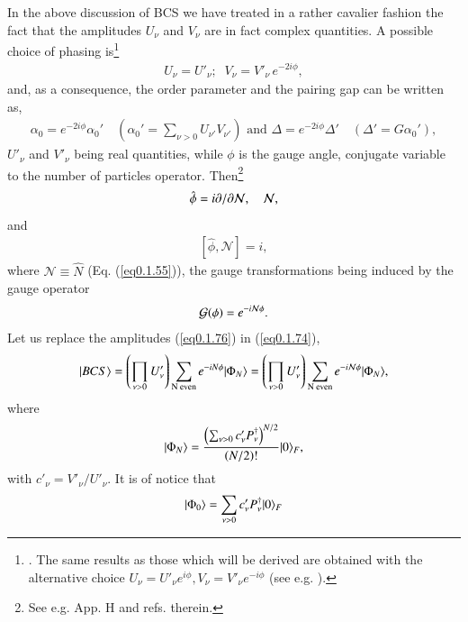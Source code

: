  In the above discussion of BCS we have treated in a rather cavalier fashion the fact that the amplitudes $U_\nu$ and $V_\nu$ are in fact complex quantities. 
  A possible choice of phasing is\footnote{\cite{Schrieffer:73}. The same results as those which will be derived are obtained with the alternative choice $U_\nu=U'_\nu e^{i\phi},V_\nu=V'_\nu e^{-i\phi}$ (see e.g. \cite{Potel:13b}).} 
\begin{align}\label{eq0.1.76}
U_\nu=U'_\nu;\;\;V_\nu=V'_\nu\, e^{-2i\phi},
\end{align}
and, as a consequence, the order parameter and the pairing gap can be written as,
\begin{align}\label{eq0.1.76x}
\alpha_0=e^{-2i\phi}\alpha_0'\quad(\alpha_0'=\sum_{\nu>0}U_{\nu'}V_{\nu'})\text{ and } \Delta=e^{-2i\phi}\Delta'\quad(\Delta'=G\alpha_0'),
\end{align}
$U'_\nu$ and $V'_\nu$ being real quantities, while $\phi$ is the gauge angle, conjugate variable to the number of particles operator. Then\footnote{See e.g. \cite{Brink:05} App. H and refs. therein.}
\begin{align}\label{eq0.1.77}
\hat\phi=i\partial/\partial \mathcal N,\quad \mathcal N, \idx{Gauge!--angle (conjugate variable to particle number)}
\end{align}
and
\begin{align}\label{eq0.1.78}
\left[\hat \phi,\mathcal N\right]=i,
\end{align}
where $\mathcal N\equiv\hat N$ (Eq. (\ref{eq0.1.55})), the gauge transformations being induced by the gauge operator 
\begin{align}\label{eq0.1.79}
\mathcal G(\phi)=e^{-i\mathcal N\phi}. \idx{Gauge!--operator}
\end{align}
Let us replace the amplitudes (\ref{eq0.1.76}) in  (\ref{eq0.1.74}),
\begin{align}\label{eq0.1.80}
|{BCS} \rangle=\left(\prod_{\nu>0}U'_\nu\right)\sum_{\text{N even}}e^{-iN\phi}|{\Phi_{N}} \rangle=\left(\prod_{\nu>0}U'_\nu\right)\sum_{\text{N even}}e^{-i\mathcal N\phi}|{\Phi_{N}} \rangle,
\end{align}
where
\begin{align}\label{eq0.1.81}
|{\Phi_{N}} \rangle=\frac{\left(\sum_{\nu>0}c'_\nu P^\dagger_\nu\right)^{N/2}}{\left(N/2\right)!}|{0} \rangle_F,
\end{align}
with $c'_\nu=V'_\nu/U'_\nu$. It is of notice that 
\begin{align}\label{eq0.1.82}
\ket{\Phi_0}=\sum_{\nu>0}c'_\nu P^\dagger_\nu\ket{0}_F\idx{Cooper pair!--state}
\end{align}
